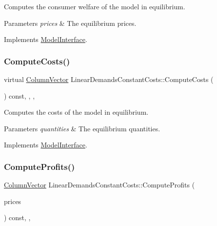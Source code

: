 Computes the consumer welfare of the model in equilibrium.


\begin{DoxyParams}{Parameters}
{\em prices} & The equilibrium prices. \\
\hline
\end{DoxyParams}


Implements \hyperlink{classModelInterface_a094ebb85618fb13bf38f6faff1f5dd7b}{Model\+Interface}.

\mbox{\label{classLinearDemandsConstantCosts_a55e0f15cfc00d8c21fbfd95843c06c44}} 
\subsubsection{\texorpdfstring{Compute\+Costs()}{ComputeCosts()}}
{\footnotesize\ttfamily virtual \hyperlink{classColumnVector}{Column\+Vector} Linear\+Demands\+Constant\+Costs\+::\+Compute\+Costs (\begin{DoxyParamCaption}\item[{\hyperlink{classColumnVector}{Column\+Vector} const \&}]{ }\end{DoxyParamCaption}) const\hspace{0.3cm}{\ttfamily [inline]}, {\ttfamily [final]}, {\ttfamily [override]}, {\ttfamily [virtual]}}

Computes the costs of the model in equilibrium.


\begin{DoxyParams}{Parameters}
{\em quantities} & The equilibrium quantities. \\
\hline
\end{DoxyParams}


Implements \hyperlink{classModelInterface_ac0a7cc3db9fc177dc75f16abf00275a7}{Model\+Interface}.

\mbox{\label{classLinearDemandsConstantCosts_a48b52dab01d2cf45beae51eab615f7ae}} 
\subsubsection{\texorpdfstring{Compute\+Profits()}{ComputeProfits()}}
{\footnotesize\ttfamily \hyperlink{classColumnVector}{Column\+Vector} Linear\+Demands\+Constant\+Costs\+::\+Compute\+Profits (\begin{DoxyParamCaption}\item[{\hyperlink{classColumnVector}{Column\+Vector} const \&}]{prices }\end{DoxyParamCaption}) const\hspace{0.3cm}{\ttfamily [final]}, {\ttfamily [override]}, {\ttfamily [virtual]}}

